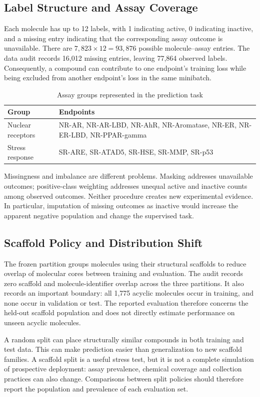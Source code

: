 \documentclass[11pt,a4paper]{article}\usepackage[margin=25mm]{geometry}\usepackage{fancyhdr}\usepackage{setspace}\usepackage{titlesec}\usepackage{xcolor}
\begin{document}
\subsection{Label Structure and Assay Coverage}
Each molecule has up to 12 labels, with 1 indicating active, 0 indicating inactive, and a missing entry indicating that the corresponding assay outcome is unavailable. There are $7,823\times12=93,876$ possible molecule--assay entries. The data audit records 16,012 missing entries, leaving 77,864 observed labels. Consequently, a compound can contribute to one endpoint's training loss while being excluded from another endpoint's loss in the same minibatch.

\begin{table}[htbp]
\centering\caption{Assay groups represented in the prediction task}
\begin{tabular}{p{}p{}}\toprule
Group & Endpoints\\\midrule
Nuclear receptors & NR-AR, NR-AR-LBD, NR-AhR, NR-Aromatase, NR-ER, NR-ER-LBD, NR-PPAR-gamma\\
Stress response & SR-ARE, SR-ATAD5, SR-HSE, SR-MMP, SR-p53\\\bottomrule
\end{tabular}
\end{table}

Missingness and imbalance are different problems. Masking addresses unavailable outcomes; positive-class weighting addresses unequal active and inactive counts among observed outcomes. Neither procedure creates new experimental evidence. In particular, imputation of missing outcomes as inactive would increase the apparent negative population and change the supervised task.

\subsection{Scaffold Policy and Distribution Shift}
The frozen partition groups molecules using their structural scaffolds to reduce overlap of molecular cores between training and evaluation. The audit records zero scaffold and molecule-identifier overlap across the three partitions. It also records an important boundary: all 1,775 acyclic molecules occur in training, and none occur in validation or test. The reported evaluation therefore concerns the held-out scaffold population and does not directly estimate performance on unseen acyclic molecules.

A random split can place structurally similar compounds in both training and test data. This can make prediction easier than generalization to new scaffold families. A scaffold split is a useful stress test, but it is not a complete simulation of prospective deployment: assay prevalence, chemical coverage and collection practices can also change. Comparisons between split policies should therefore report the population and prevalence of each evaluation set.
\end{document}

